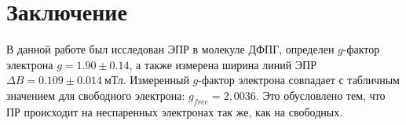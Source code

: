 \documentclass[a4paper,12pt]{article}
\begin{document}
\section*{Заключение}
В данной работе был исследован ЭПР в молекуле ДФПГ, определен $g$-фактор электрона ${g = 1.90 \pm 0.14}$, а также измерена ширина линий ЭПР $\Delta B = 0.109 \pm 0.014~\text{мТл}$. Измеренный $g$-фактор электрона совпадает с табличным значением для свободного электрона: ${g_{free} = 2,0036}$. Это обусловлено тем, что ПР происходит на неспаренных электронах так же, как на свободных.
\end{document}
